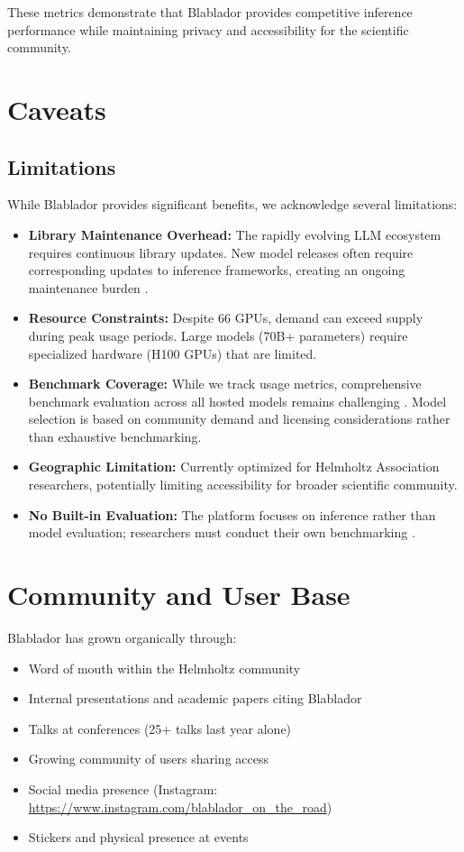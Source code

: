 \documentclass[10pt,conference]{IEEEtran}
\begin{document}
These metrics demonstrate that Blablador provides competitive inference performance while maintaining privacy and accessibility for the scientific community.

\section{Caveats}


\subsection{Limitations}

While Blablador provides significant benefits, we acknowledge several limitations:

\begin{itemize}
    \item \textbf{Library Maintenance Overhead:} The rapidly evolving LLM ecosystem requires continuous library updates. New model releases often require corresponding updates to inference frameworks, creating an ongoing maintenance burden \cite{vllm}.
    \item \textbf{Resource Constraints:} Despite 66 GPUs, demand can exceed supply during peak usage periods. Large models (70B+ parameters) require specialized hardware (H100 GPUs) that are limited.
    \item \textbf{Benchmark Coverage:} While we track usage metrics, comprehensive benchmark evaluation across all hosted models remains challenging \cite{llmbenchmarks}. Model selection is based on community demand and licensing considerations rather than exhaustive benchmarking.
    \item \textbf{Geographic Limitation:} Currently optimized for Helmholtz Association researchers, potentially limiting accessibility for broader scientific community.
    \item \textbf{No Built-in Evaluation:} The platform focuses on inference rather than model evaluation; researchers must conduct their own benchmarking \cite{llmbenchmarks}.
\end{itemize}

\section{Community and User Base}
Blablador has grown organically through:
\begin{itemize}
    \item Word of mouth within the Helmholtz community
    \item Internal presentations and academic papers citing Blablador
    \item Talks at conferences (25+ talks last year alone)
    \item Growing community of users sharing access
    \item Social media presence (Instagram: \url{https://www.instagram.com/blablador_on_the_road})
    \item Stickers and physical presence at events
\end{itemize}
\end{document}
